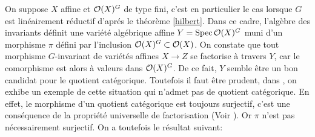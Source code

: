 On suppose $X$ affine et $\mathcal{O}(X)^G$ de type fini, c'est en particulier le cas lorsque $G$ est linéairement réductif d'aprés le théorème \ref{hilbert}. Dans ce cadre, l'algèbre des invariants définit une variété algébrique affine $Y=\operatorname{Spec} \mathcal{O}(X)^G$ muni d'un morphisme $\pi$ défini par l'inclusion $\mathcal{O}(X)^G\subset \mathcal{O}(X)$. On constate que tout morphisme $G$-invariant de variétés affines $X\rightarrow Z$ se factorise à travers $Y$, car le comorphisme est alors à valeurs dans $\mathcal{O}(X)^G$. De ce fait, $Y$ semble être un bon candidat pour le quotient catégorique. Toutefois il faut être prudent, dans \cite[6.4.10]{LAGFerrer}, on exhibe un exemple de cette situation qui n'admet pas de quotient catégorique. En effet, le morphisme d'un quotient catégorique est toujours surjectif, c'est une conséquence de la propriété universelle de factorisation (Voir  \cite[6.4.5]{LAGFerrer}). Or $\pi$ n'est pas nécessairement surjectif. On a toutefois le résultat suivant:

